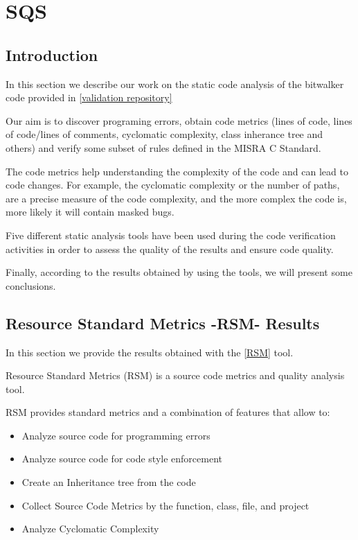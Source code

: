 
\section{SQS}
\label{sec:sqs}

\subsection{Introduction}
In this section we describe our work on the static code analysis of the bitwalker code provided in \href{https://github.com/openETCS/validation/tree/master/Artifacts/Subset-026-7_XML/Subset026_7/Bitwalker}{[validation repository]}

Our aim is to discover programing errors, obtain code metrics (lines of code, lines of code/lines of comments, cyclomatic complexity, class inherance tree and others) and verify some subset of rules defined in the MISRA C Standard.

The code metrics help understanding the complexity of the code and can lead to code changes. For
example, the cyclomatic complexity or the number of paths, are a precise measure of the code complexity, and the more complex the code is, more likely it will contain masked bugs.

Five different static analysis tools have been used during the code verification activities in order to assess the quality of the results and ensure code quality.

Finally, according to the results obtained by using the tools, we will present some conclusions.

\subsection{Resource Standard Metrics -RSM- Results}
In this section we provide the results obtained with the \href{http://msquaredtechnologies.com/m2rsm/}{[RSM]} tool.

Resource Standard Metrics (RSM) is a source code metrics and quality analysis tool.

RSM provides standard metrics and a combination of features that allow to:
\begin{itemize}
\item Analyze source code for programming errors
\item Analyze source code for code style enforcement
\item Create an Inheritance tree from the code
\item Collect Source Code Metrics by the function, class, file, and project
\item Analyze Cyclomatic Complexity
\end{itemize}

